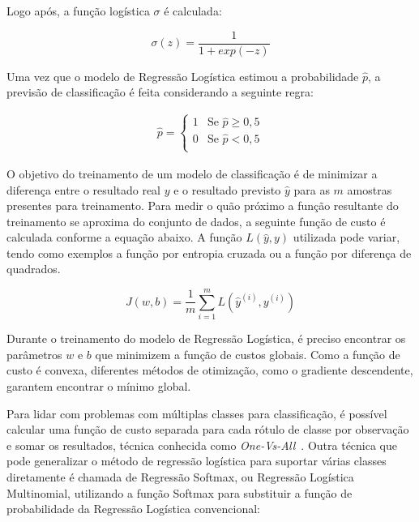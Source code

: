 \documentclass[portugues]{ic-tese}
\begin{document}
Logo após, a função logística $\sigma$ é calculada:

\begin{equation}
\sigma (z) = \frac{1}{1 + exp(-z)}
\end{equation}

Uma vez que o modelo de Regressão Logística estimou a probabilidade $\hat{p}$, a previsão de classificação é feita considerando a seguinte regra:

\begin{equation}
	\begin{aligned}
	\hat{p} = 
	\begin{cases}
	1 & \text{Se $\hat{p} \geqslant 0,5$}\\
	0 & \text{Se $\hat{p} < 0,5$}\\
	\end{cases}
	\end{aligned}
\end{equation}

O objetivo do treinamento de um modelo de classificação é de minimizar a diferença entre o resultado real $y$ e o resultado previsto $\hat{y}$ para as $m$ amostras presentes para treinamento. Para medir o quão próximo a função resultante do treinamento se aproxima do conjunto de dados, a seguinte função de custo é calculada conforme a equação abaixo. A função $L(\hat{y}, y)$ utilizada pode variar, tendo como exemplos a função por entropia cruzada ou a função por diferença de quadrados.

\begin{equation}
J(w,b) = \frac{1}{m} \sum^{m}_{i=1} L(\hat{y}^{(i)}, y^{(i)})
\end{equation}

Durante o treinamento do modelo de Regressão Logística, é preciso encontrar os parâmetros $w$ e $b$ que minimizem a função de custos globais. Como a função de custo é convexa, diferentes métodos de otimização, como o gradiente descendente, garantem encontrar o mínimo global.

Para lidar com problemas com múltiplas classes para classificação, é possível calcular uma função de custo separada para cada rótulo de classe por observação e somar os resultados, técnica conhecida como \textit{One-Vs-All}~\citep{Rifkin_2004}. Outra técnica que pode generalizar o método de regressão logística para suportar várias classes diretamente é chamada de Regressão Softmax, ou Regressão Logística Multinomial, utilizando a função Softmax para substituir a função de probabilidade da Regressão Logística convencional:
\end{document}
